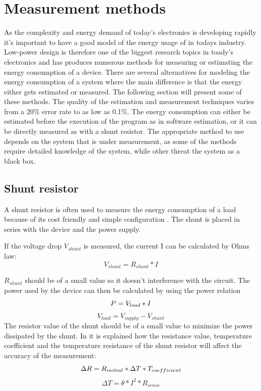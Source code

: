 \chapter{Measurement methods}
As the complexity and energy demand of today's electronics is developing rapidly it's  important to have a good model of the energy usage of in todays industry. Low-power design is therefore one of the biggest research topics in toady's electronics and has produces numerous methods for measuring or estimating the energy consumption of a device. There are several alternatives for modeling the energy consumption of a system where the main difference is that the energy either gets estimated or measured. The following section will present some of these methods. The quality of the estimation and measurement techniques varies from a 20\% error rate to as low as 0.1\%.  The energy consumption can either be estimated before the execution of the program as in software estimation, or it can be directly measured as with a shunt resistor. The appropriate method to use depends on the system that is under measurement, as some of the methods require detailed knowledge of the system, while other threat the system as a black box.
\section{Shunt resistor}
A shunt resistor is often used to measure the energy consumption of a load because of its cost friendly and simple configuration \cite{Intersil} \cite{Infineon} \cite{Vishay}. The shunt is placed in series with the device and the power supply.

If the voltage drop $V_{shunt}$ is measured, the current I can be calculated by Ohms law:\begin{equation}
V_{shunt}=R_{shunt}*I
\end{equation}

$R_{shunt}$ should be of a small value so it doesn't interference with the circuit. The power used by the device can then be calculated by using the power relation \begin{equation}
P=V_{load}*I \\
\end{equation}
\begin{equation}
V_{load}= V_{supply}-V_{shunt}
\end{equation}
\newline The resistor value of the shunt should be of a small value to minimize the power dissipated by the shunt. In \cite{Intersil} it is explained how the resistance value, temperature coefficient and the temperature resistance of the shunt resistor will affect the accuracy of the measurement:
\begin{equation}
\Delta R= R_{initial}* \Delta T * T_{coefficient}\\
\label{rchange}
\end{equation}
\begin{equation}
 \Delta T = \theta * I^{2}*R_{sense}
\end{equation}

